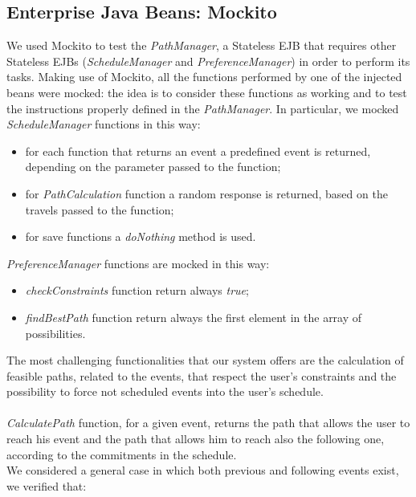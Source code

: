 \subsection{Enterprise Java Beans: Mockito}
We used Mockito to test the \textit{PathManager}, a Stateless EJB that requires other Stateless EJBs (\textit{ScheduleManager} and \textit{PreferenceManager}) in order to perform its tasks. Making use of Mockito, all the functions performed by one of the injected beans were mocked: the idea is to consider these functions as working and to test the instructions properly defined in the \textit{PathManager}. 
\newpage
In particular, we mocked \textit{ScheduleManager} functions in this way:
\begin{itemize}
	\item for each function that returns an event a predefined event is returned, depending on the parameter passed to the function;
	\item for \textit{PathCalculation} function a random response is returned, based on the travels passed to the function;
	\item for save functions a \textit{doNothing} method is used.
\end{itemize}  
\textit{PreferenceManager} functions are mocked in this way:
\begin{itemize}
	\item \textit{checkConstraints} function return always \textit{true};
	\item \textit{findBestPath} function return always the first element in the array of possibilities.
\end{itemize}
The most challenging functionalities that our system offers are the calculation of feasible paths, related to the events, that respect the user's constraints and  the possibility to force not scheduled events into the user's schedule. \\ \\
\textit{CalculatePath} function, for a given event, returns the path that allows the user to reach his event and the path that allows him to reach also the following one, according to the commitments in the schedule. \\
We considered a general case in which both previous and following events exist, we verified that:

